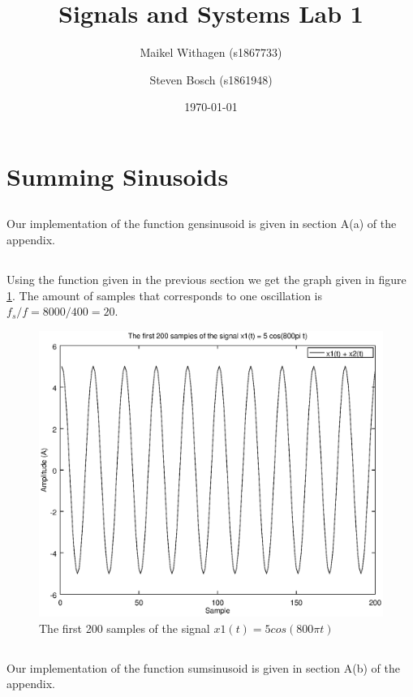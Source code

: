 \documentclass[10pt]{article}
\title{Signals and Systems Lab 1}
\author{Maikel Withagen (s1867733) \and Steven Bosch (s1861948)}
\date{\today}
\begin{document}
\maketitle

\section{Summing Sinusoids}
\subsection{}
Our implementation of the function gensinusoid is given in section A(a) of the appendix.

\subsection{}
Using the function given in the previous section we get the graph given in figure \ref{fig1b}. The amount of samples that corresponds to one oscillation is $f_s/f=8000/400=20$.
\begin{figure}[H]
  \centering
  \includegraphics[width=.8\columnwidth]{plot1A.eps}
  \caption{The first 200 samples of the signal $x1(t) = 5cos(800\pi t)$}
  \label{fig1b}
\end{figure}

\subsection{}
Our implementation of the function sumsinusoid is given in section A(b) of the appendix.
\end{document}
